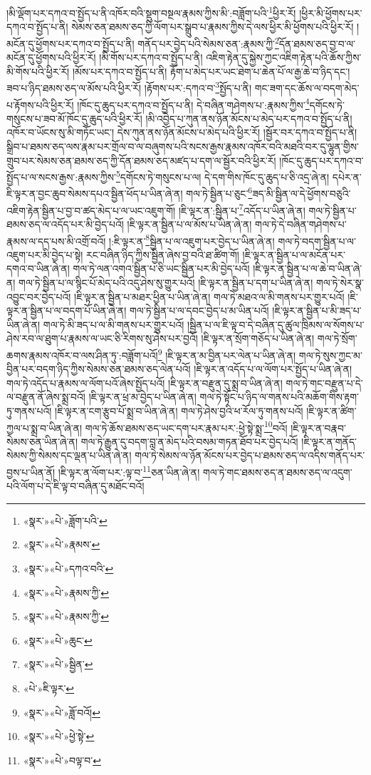 །མི་ལྡོག་པར་དཀའ་བ་སྤྱོད་པ་ནི་འཁོར་བའི་སྡུག་བསྔལ་རྣམས་ཀྱིས་མི་:བཟློག་པའི་\footnote{«སྣར་»«པེ་»ཟློག་པའི་}ཕྱིར་རོ། །ཕྱིར་མི་ཕྱོགས་པར་དཀའ་བ་སྤྱོད་པ་ནི། སེམས་ཅན་ཐམས་ཅད་ཀྱི་ལོག་པར་སྒྲུབ་པ་རྣམས་ཀྱིས་དེ་ལས་ཕྱིར་མི་ཕྱོགས་པའི་ཕྱིར་རོ། །མངོན་དུ་ཕྱོགས་པར་དཀའ་བ་སྤྱོད་པ་ནི། གནོད་པར་བྱེད་པའི་སེམས་ཅན་:རྣམས་ཀྱི་\footnote{«སྣར་»«པེ་»རྣམས་}དོན་ཐམས་ཅད་བྱ་བ་ལ་མངོན་དུ་ཕྱོགས་པའི་ཕྱིར་རོ། །མི་གོས་པར་དཀའ་བ་སྤྱོད་པ་ནི། འཇིག་རྟེན་དུ་སྐྱེས་ཀྱང་འཇིག་རྟེན་པའི་ཆོས་ཀྱིས་མི་གོས་པའི་ཕྱིར་རོ། །མོས་པར་དཀའ་བ་སྤྱོད་པ་ནི། རྟོག་པ་མེད་པར་ཡང་ཐེག་པ་ཆེན་པོ་ལ་རྒྱ་ཆེ་བ་ཉིད་དང་། ཟབ་པ་ཉིད་ཐམས་ཅད་ལ་མོས་པའི་ཕྱིར་རོ། །རྟོགས་པར་:དཀའ་བ་\footnote{«སྣར་»«པེ་»དཀའ་བའི་}སྤྱོད་པ་ནི། གང་ཟག་དང་ཆོས་ལ་བདག་མེད་པ་རྟོགས་པའི་ཕྱིར་རོ། །ཁོང་དུ་ཆུད་པར་དཀའ་བ་སྤྱོད་པ་ནི། དེ་བཞིན་གཤེགས་པ་:རྣམས་ཀྱིས་\footnote{«སྣར་»«པེ་»རྣམས་ཀྱི་}དགོངས་ཏེ་གསུངས་པ་ཟབ་མོ་ཁོང་དུ་ཆུད་པའི་ཕྱིར་རོ། །མི་འབྱེད་པ་ཀུན་ནས་ཉོན་མོངས་པ་མེད་པར་དཀའ་བ་སྤྱོད་པ་ནི། འཁོར་བ་ཡོངས་སུ་མི་གཏོང་ཡང་། དེས་ཀུན་ནས་ཉོན་མོངས་པ་མེད་པའི་ཕྱིར་རོ། །སྦྱོར་བར་དཀའ་བ་སྤྱོད་པ་ནི། སྒྲིབ་པ་ཐམས་ཅད་ལས་རྣམ་པར་གྲོལ་བ་ལ་བཞུགས་པའི་སངས་རྒྱས་རྣམས་འཁོར་བའི་མཐའི་བར་དུ་ལྷུན་གྱིས་གྲུབ་པར་སེམས་ཅན་ཐམས་ཅད་ཀྱི་དོན་ཐམས་ཅད་མཛད་པ་དག་ལ་སྦྱོར་བའི་ཕྱིར་རོ། །ཁོང་དུ་ཆུད་པར་དཀའ་བ་སྤྱོད་པ་ལ་སངས་རྒྱས་:རྣམས་ཀྱིས་\footnote{«སྣར་»«པེ་»རྣམས་ཀྱི་}དགོངས་ཏེ་གསུངས་པ་ལ། དེ་དག་གིས་ཁོང་དུ་ཆུད་པ་ཅི་འདྲ་ཞེ་ན། དཔེར་ན་ཇི་ལྟར་ན་བྱང་ཆུབ་སེམས་དཔའ་སྦྱིན་ཕོད་པ་ཡིན་ཞེ་ན། གལ་ཏེ་སྦྱིན་པ་ཅུང་\footnote{«སྣར་»«པེ་»ཆུང་}ཟད་མི་སྦྱིན་ལ་དེ་ཕྱོགས་བཅུའི་འཇིག་རྟེན་སྦྱིན་པ་བྱ་བ་ཚད་མེད་པ་ལ་ཡང་འཇུག་གོ། །ཇི་ལྟར་ན་:སྦྱིན་པ་\footnote{«སྣར་»«པེ་»སྦྱིན་}འདོད་པ་ཡིན་ཞེ་ན། གལ་ཏེ་སྦྱིན་པ་ཐམས་ཅད་ལ་འདོད་པར་མི་བྱེད་པའོ། །ཇི་ལྟར་ན་སྦྱིན་པ་ལ་མོས་པ་ཡིན་ཞེ་ན། གལ་ཏེ་དེ་བཞིན་གཤེགས་པ་རྣམས་ལ་དད་པས་མི་འགྲོ་བའོ། །:ཇི་ལྟར་ན་\footnote{«པེ་»ཇི་ལྟར་}སྦྱིན་པ་ལ་འཇུག་པར་བྱེད་པ་ཡིན་ཞེ་ན། གལ་ཏེ་བདག་སྦྱིན་པ་ལ་འཇུག་པར་མི་བྱེད་པ་སྟེ། རང་བཞིན་ཉིད་ཀྱིས་སྦྱིན་ཞེས་བྱ་བའི་ཐ་ཚིག་གོ། །ཇི་ལྟར་ན་སྦྱིན་པ་ལ་མངོན་པར་དགའ་བ་ཡིན་ཞེ་ན། གལ་ཏེ་ལན་འགའ་སྦྱིན་པ་ཅི་ཡང་སྦྱིན་པར་མི་བྱེད་པའོ། །ཇི་ལྟར་ན་སྦྱིན་པ་ལ་ཆེ་བ་ཡིན་ཞེ་ན། གལ་ཏེ་སྦྱིན་པ་ལ་སྙིང་པོ་མེད་པའི་འདུ་ཤེས་སུ་གྱུར་པའོ། །ཇི་ལྟར་ན་སྦྱིན་པ་དག་པ་ཡིན་ཞེ་ན། གལ་ཏེ་སེར་སྣ་འབྱུང་བར་བྱེད་པའོ། །ཇི་ལྟར་ན་སྦྱིན་པ་མཐར་ཕྱིན་པ་ཡིན་ཞེ་ན། གལ་ཏེ་མཐའ་ལ་མི་གནས་པར་གྱུར་པའོ། །ཇི་ལྟར་ན་སྦྱིན་པ་ལ་བདག་པོ་ཡིན་ཞེ་ན། གལ་ཏེ་སྦྱིན་པ་ལ་དབང་བྱེད་པ་མ་ཡིན་པའོ། །ཇི་ལྟར་ན་སྦྱིན་པ་མི་ཟད་པ་ཡིན་ཞེ་ན། གལ་ཏེ་མི་ཟད་པ་ལ་མི་གནས་པར་གྱུར་པའོ། །སྦྱིན་པ་ལ་ཇི་ལྟ་བ་དེ་བཞིན་དུ་ཚུལ་ཁྲིམས་ལ་སོགས་པ་ཤེས་རབ་ལ་ཐུག་པ་རྣམས་ལ་ཡང་ཅི་རིགས་སུ་ཤེས་པར་བྱའོ། །ཇི་ལྟར་ན་སྲོག་གཅོད་པ་ཡིན་ཞེ་ན། གལ་ཏེ་སྲོག་ཆགས་རྣམས་འཁོར་བ་ལས་ཤིན་ཏུ་:བཟློག་པའོ།\footnote{«སྣར་»«པེ་»ཟློ་བའོ།} །ཇི་ལྟར་ན་མ་བྱིན་པར་ལེན་པ་ཡིན་ཞེ་ན། གལ་ཏེ་སུས་ཀྱང་མ་བྱིན་པར་བདག་ཉིད་ཀྱིས་སེམས་ཅན་ཐམས་ཅད་ལེན་པའོ། །ཇི་ལྟར་ན་འདོད་པ་ལ་ལོག་པར་སྤྱོད་པ་ཡིན་ཞེ་ན། གལ་ཏེ་འདོད་པ་རྣམས་ལ་ལོག་པའོ་ཞེས་སྤྱོད་པའོ། །ཇི་ལྟར་ན་བརྫུན་དུ་སྨྲ་བ་ཡིན་ཞེ་ན། གལ་ཏེ་གང་བརྫུན་པ་དེ་ལ་བརྫུན་ནོ་ཞེས་སྨྲ་བའོ། །ཇི་ལྟར་ན་ཕྲ་མ་བྱེད་པ་ཡིན་ཞེ་ན། གལ་ཏེ་སྟོང་པ་ཉིད་ལ་གནས་པའི་མཆོག་གིས་རྟག་ཏུ་གནས་པའོ། །ཇི་ལྟར་ན་ངག་རྩུབ་པོ་སྨྲ་བ་ཡིན་ཞེ་ན། གལ་ཏེ་ཤེས་བྱའི་ཕ་རོལ་ཏུ་གནས་པའོ། །ཇི་ལྟར་ན་ཚིག་ཀྱལ་པ་སྨྲ་བ་ཡིན་ཞེ་ན། གལ་ཏེ་ཆོས་ཐམས་ཅད་ཡང་དག་པར་རྣམ་པར་:ཕྱེ་སྟེ་སྨྲ་\footnote{«སྣར་»«པེ་»ཕྱེ་སྟེ་}བའོ། །ཇི་ལྟར་ན་བརྣབ་སེམས་ཅན་ཡིན་ཞེ་ན། གལ་ཏེ་རྒྱུན་དུ་བདག་བླ་ན་མེད་པའི་བསམ་གཏན་ཐོབ་པར་བྱེད་པའོ། །ཇི་ལྟར་ན་གནོད་སེམས་ཀྱི་སེམས་དང་ལྡན་པ་ཡིན་ཞེ་ན། གལ་ཏེ་སེམས་ལ་ཉོན་མོངས་པར་བྱེད་པ་ཐམས་ཅད་ལ་འདིས་གནོད་པར་བྱས་པ་ཡིན་ནོ། །ཇི་ལྟར་ན་ལོག་པར་:ལྟ་བ་\footnote{«སྣར་»«པེ་»བལྟ་བ་}ཅན་ཡིན་ཞེ་ན། གལ་ཏེ་གང་ཐམས་ཅད་ན་ཐམས་ཅད་ལ་འདུག་པའི་ལོག་པ་དེ་ཇི་ལྟ་བ་བཞིན་དུ་མཐོང་བའོ། 